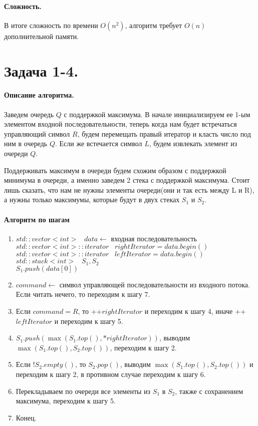 \documentclass[12pt]{article}
\begin{document}
\paragraph{Сложность.}
В итоге сложность по времени $ O(n^2) $, алгоритм требует $ O(n) $ дополнительной памяти.




\section{Задача 1-4.} 
\paragraph{Описание алгоритма.}
Заведем очередь $ Q $ с поддержкой максимума. В начале инициализируем ее 1-ым элементом входной последовательности, 
теперь когда нам будет встречаться управляющий символ $ R $, будем перемещать правый
итератор и класть число под ним в очередь $ Q $. Если же встечается символ $ L $, будем извлекать 
элемент из очереди $ Q $.

Поддерживать максимум в очереди будем схожим образом с поддержкой минимума в очереди, а именно заведем 2 стека с 
поддержкой максимума. Стоит лишь сказать, что нам не нужны элементы очереди(они и так есть между L и R), 
а нужны только максимумы, которые будут в двух стеках $ S_1 $ и $ S_2 $. 


\paragraph{Алгоритм по шагам}
\begin{enumerate}
    \item $ std::vector<int> \;\;\; data \leftarrow $ входная последовательность \\
          $ std::vector<int>::iterator \;\;\; rightIterator = data.begin() $ \\
          $ std::vector<int>::iterator \;\;\; leftIterator = data.begin() $ \\
          $ std::stack<int> \;\;\; S_1, S_2 $ \\
          $ S_1.push(data[0]) $
    \item $ command \leftarrow $ символ управляющей последовательности из входного потока.
          Если читать нечего, то переходим к шагу 7.
    \item Если $ command = R $, то   ++$rightIterator $ и переходим к шагу 4, иначе ++$leftIterator$ и переходим к шагу 5.
    \item $ S_1.push(\max(S_1.top(), *rightIterator)) $, выводим $ \max(S_1.top(), S_2.top()) $, переходим к шагу 2.
    \item Если $ ! S_2.empty() $, то $ S_2.pop() $, выводим $ \max(S_1.top(), S_2.top()) $ и переходим к шагу 2,
          в противном случае переходим к шагу 6.
    \item Перекладываем по очереди все элементы из $ S_1 $ в $ S_2 $, также с сохранением максимума, переходим к шагу 5.
    \item Конец.
\end{enumerate}
\end{document}
